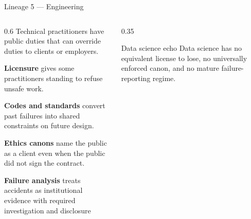 \documentclass[9pt,aspectratio=169]{beamer}
\begin{document}
\begin{frame}{Lineage 5 --- Engineering}
    \begin{columns}[T]
        \begin{column}{0.6\textwidth}
            Technical practitioners have public duties that can override duties to clients or employers.

            \medskip

            \textbf{Licensure} gives some practitioners standing to refuse unsafe work.

            \medskip

            \textbf{Codes and standards} convert past failures into shared constraints on future design.

            \medskip

            \textbf{Ethics canons} name the public as a client even when the public did not sign the contract.

            \medskip

            \textbf{Failure analysis} treats accidents as institutional evidence with required investigation and disclosure
        \end{column}
        \begin{column}{0.35\textwidth}
            \begin{alertblock}{Data science echo}
                \small
                Data science has no equivalent license to lose, no universally enforced canon, and no mature failure-reporting regime.
            \end{alertblock}
        \end{column}
    \end{columns}
\end{frame}
\end{document}

